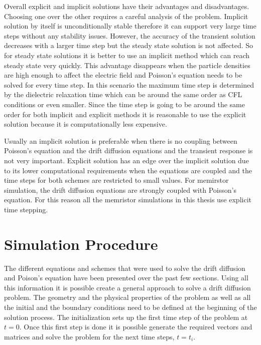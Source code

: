 \begin{doublespace}
Overall explicit and implicit solutions have their advantages and disadvantages. Choosing one over the other requires a careful analysis of the problem. Implicit solution by itself is unconditionally stable therefore it can support very large time steps without any stability issues. However, the accuracy of the transient solution decreases with a larger time step but the steady state solution is not affected. So for steady state solutions it is better to use an implicit method which can reach steady state very quickly. This advantage disappears when the particle densities are high enough to affect the electric field and Poisson's equation needs to be solved for every time step. In this scenario the maximum time step is determined by the dielectric relaxation time which can be around the same order as CFL conditions or even smaller. Since the time step is going to be around the same order for both implicit and explicit methods it is reasonable to use the explicit solution because it is computationally less expensive.

Usually an implicit solution is preferable when there is no coupling between Poisson's equation and the drift diffusion equations and the transient response is not very important. Explicit solution has an edge over the implicit solution due to its lower computational requirements when the equations are coupled and the time steps for both schemes are restricted to small values. For memirstor simulation, the drift diffusion equations are strongly coupled with Poisson's equation. For this reason all the memristor simulations in this thesis use explicit time stepping. 


\clearpage
\section{Simulation Procedure}
The different equations and schemes that were used to solve the drift diffusion  and Poison's equation have been presented over the past few sections. Using all this information it is possible create a general approach to solve a drift diffusion problem. The geometry and the physical properties of the problem as well as all the initial and the boundary conditions need to be defined at the beginning of the solution process. The initialization sets up the first time step of the problem at $t=0$. Once this first step is done it is possible generate the required vectors and matrices and solve the problem for the next time steps, $t=t_i$. 


\end{doublespace}
